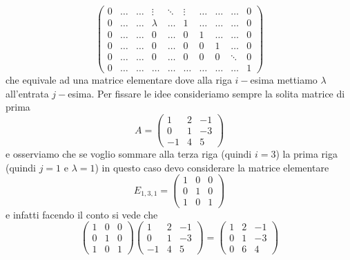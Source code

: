 \begin{enumerate}
$$\begin{pmatrix}
      0 & \ldots & \ldots & \vdots & \ddots & \vdots & \ldots & \ldots & \ldots & 0 \\
      0 & \ldots & \ldots & \lambda & \ldots & 1 & \ldots & \ldots & \ldots & 0 \\
      0 & \ldots & \ldots & 0 & \ldots & 0 & 1 & \ldots & \ldots & 0 \\
      0 & \ldots & \ldots & 0 & \ldots & 0 & 0 & 1 & \ldots & 0 \\
      0 & \ldots & \ldots & 0 & \ldots & 0 & 0 & 0 & \ddots & 0 \\
      0 & \ldots & \ldots & \ldots & \ldots & \ldots & \ldots & \ldots & \ldots & 1
    \end{pmatrix}
  $$
  che equivale ad una matrice elementare dove alla riga $i-$esima mettiamo $\lambda$ all'entrata $j-$esima. Per fissare le idee consideriamo sempre la solita matrice di prima $$
    A = \begin{pmatrix}
      1 & 2 & -1 \\
      0 & 1 & -3 \\
      -1 & 4 & 5 
    \end{pmatrix}
  $$
  e osserviamo che se voglio sommare alla terza riga (quindi $i=3$) la prima riga (quindi $j = 1$ e $\lambda = 1$) in questo caso devo considerare la matrice elementare
  $$
    E_{1, 3, 1} = \begin{pmatrix}
      1 & 0 & 0 \\
      0 & 1 & 0 \\
      1 & 0 & 1
    \end{pmatrix}
  $$
  e infatti facendo il conto si vede che
  $$
    \begin{pmatrix}
      1 & 0 & 0 \\
      0 & 1 & 0 \\
      1 & 0 & 1
    \end{pmatrix} \begin{pmatrix}
      1 & 2 & -1 \\
      0 & 1 & -3 \\
      -1 & 4 & 5 
    \end{pmatrix} = \begin{pmatrix}
      1 & 2 & -1 \\
      0 & 1 & -3 \\
      0 & 6 & 4
    \end{pmatrix}
  $$
\end{enumerate}

